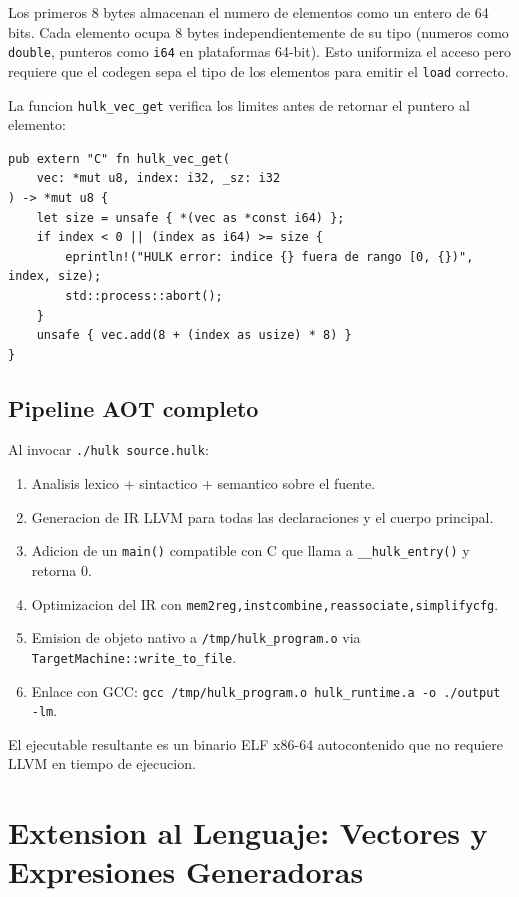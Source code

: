 \documentclass[12pt,a4paper]{article}
\begin{document}
Los primeros 8 bytes almacenan el numero de elementos como un entero de 64 bits.
Cada elemento ocupa 8 bytes independientemente de su tipo (numeros como
\texttt{double}, punteros como \texttt{i64} en plataformas 64-bit). Esto uniformiza
el acceso pero requiere que el codegen sepa el tipo de los elementos para emitir
el \texttt{load} correcto.

La funcion \texttt{hulk\_vec\_get} verifica los limites antes de retornar el puntero
al elemento:
\begin{lstlisting}[style=rust, caption={Bounds check en hulk\_vec\_get}]
pub extern "C" fn hulk_vec_get(
    vec: *mut u8, index: i32, _sz: i32
) -> *mut u8 {
    let size = unsafe { *(vec as *const i64) };
    if index < 0 || (index as i64) >= size {
        eprintln!("HULK error: indice {} fuera de rango [0, {})", index, size);
        std::process::abort();
    }
    unsafe { vec.add(8 + (index as usize) * 8) }
}
\end{lstlisting}

\subsection{Pipeline AOT completo}

Al invocar \texttt{./hulk source.hulk}:

\begin{enumerate}
  \item Analisis lexico + sintactico + semantico sobre el fuente.
  \item Generacion de IR LLVM para todas las declaraciones y el cuerpo principal.
  \item Adicion de un \texttt{main()} compatible con C que llama a
    \texttt{\_\_hulk\_entry()} y retorna 0.
  \item Optimizacion del IR con \texttt{mem2reg,instcombine,reassociate,simplifycfg}.
  \item Emision de objeto nativo a \texttt{/tmp/hulk\_program.o} via
    \texttt{TargetMachine::write\_to\_file}.
  \item Enlace con GCC: \texttt{gcc /tmp/hulk\_program.o hulk\_runtime.a -o ./output -lm}.
\end{enumerate}

El ejecutable resultante es un binario ELF x86-64 autocontenido que no requiere
LLVM en tiempo de ejecucion.

\section{Extension al Lenguaje: Vectores y Expresiones Generadoras}
\label{sec:extension}
\end{document}
